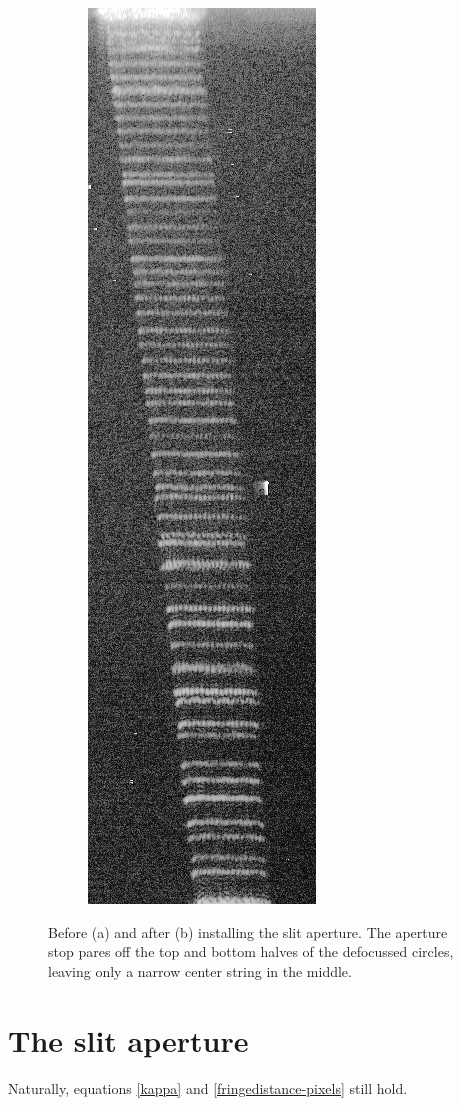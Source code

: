 \documentclass[10pt]{book}
\begin{document}
\begin{figure}[h!]
\begin{subfigure}[b]{0.4\textwidth}
        \includegraphics[height=0.6\textheight]{img/slitted.jpg}
        \caption{}
    \end{subfigure}
    \caption{Before (a) and after (b) installing the slit aperture. The aperture
    stop pares off the top and bottom halves of the defocussed circles, leaving
only a narrow center string in the middle.}
    \label{fig:globalsizing}
\end{figure}

\section{The slit aperture}
Naturally, equations \eqref{kappa} and \eqref{fringedistance-pixels} still hold.
\end{document}
